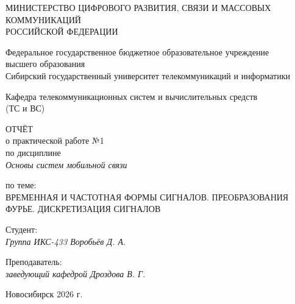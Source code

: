 \documentclass[a4paper,14pt,oneside,openany]{memoir}
\begin{document}
\thispagestyle{empty}

\begin{center}
    МИНИСТЕРСТВО ЦИФРОВОГО РАЗВИТИЯ, СВЯЗИ И МАССОВЫХ КОММУНИКАЦИЙ \\ РОССИЙСКОЙ ФЕДЕРАЦИИ

    \vspace{20pt}

    Федеральное государственное бюджетное образовательное учреждение \\ высшего образования \\
    \textquotedbl{}Сибирский государственный университет телекоммуникаций и информатики\textquotedbl{}

    \vspace{20pt}

    Кафедра телекоммуникационных систем и вычислительных средств \\ (ТС и ВС)
\end{center}

\vfill

\begin{center}
    ОТЧЁТ \\
    о практической работе №1 \\
    по дисциплине \\
    \textit{\textquotedbl{}Основы систем мобильной связи\textquotedbl{}}

    \vspace{20pt}

    по теме: \\
    \uppercase{Временная и частотная формы сигналов. Преобразования Фурье. Дискретизация сигналов}
\end{center}

\vfill

    \noindent Студент: \\
    \textit{Группа ИКС-433 \hfill Воробьёв Д. А.}

    \vspace{20pt}

    \noindent Преподаватель: \\
    \textit{заведующий кафедрой \hfill Дроздова В. Г.}

\vfill

\begin{center}
    Новосибирск 2026 г.
\end{center}

\newpage
\setcounter{page}{2}
\OnehalfSpacing*

\tableofcontents*
\end{document}
